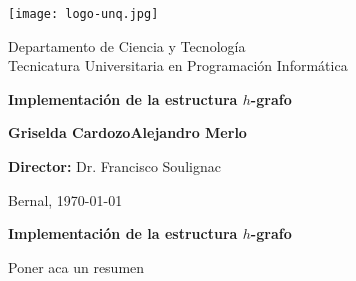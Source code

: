 \documentclass[%
    a4paper,%
    fontsize=12pt,%
    DIV=12,
    twoside,%
    openright,%
    titlepage=true,%
    headsepline,%
    toc=bibliography,%
    parskip=half,%
    cleardoublepage=empty,%
    headings=big,%
]{scrbook}
\begin{document}

\frontmatter
\begin{titlepage}


\begin{center}
\texttt{[image: logo-unq.jpg]}\\

\medskip

Departamento de Ciencia y Tecnología\\
Tecnicatura Universitaria en Programación Informática\\

\vspace{3cm}

\textbf{\huge Implementación de la estructura $h$-grafo}\\[0.4cm] 

\vspace{1.5cm}

{\large \bfseries {}Griselda CardozoAlejandro Merlo}

\end{center}

\vspace{3cm}

\textbf{Director:} Dr. Francisco Soulignac

\vspace{5mm}

Bernal, \today
{}
\end{titlepage}


\newpage


\cleardoublepage

\vspace*{2cm}

\begin{center}
\Large \textbf{Implementación de la estructura $h$-grafo}
\end{center}


Poner aca un resumen
\end{document}
